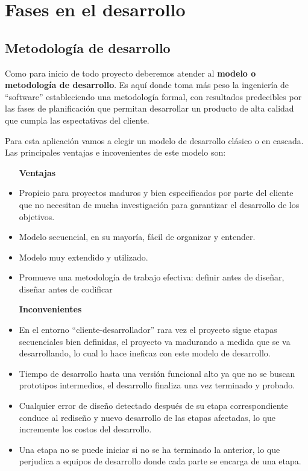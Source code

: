 \chapter{Fases en el desarrollo}

\section{Metodología de desarrollo}

Como para inicio de todo proyecto deberemos atender al \textbf{modelo o metodología de desarrollo}. Es aquí donde toma más peso la ingeniería de ``software'' estableciendo una metodología formal, con resultados predecibles por las fases de planificación que permitan desarrollar un producto de alta calidad que cumpla las espectativas del cliente. 

Para esta aplicación vamos a elegir un modelo de desarrollo clásico o en cascada. Las principales ventajas e incovenientes de este modelo son:

\begin{itemize}
\item [\textbf{Ventajas}]
\item Propicio para proyectos maduros y bien especificados por parte del cliente que no necesitan de mucha investigación para garantizar el desarrollo de los objetivos.
\item Modelo secuencial, en su mayoría, fácil de organizar y entender.
\item Modelo muy extendido y utilizado.
\item Promueve una metodología de trabajo efectiva: definir antes de diseñar, diseñar antes de codificar
\item [\textbf{Inconvenientes}]
\item En el entorno ``cliente-desarrollador'' rara vez el proyecto sigue etapas secuenciales bien definidas, el proyecto va madurando a medida que se va desarrollando, lo cual lo hace ineficaz con este modelo de desarrollo.
\item Tiempo de desarrollo hasta una versión funcional alto ya que no se buscan prototipos intermedios, el desarrollo finaliza una vez terminado y probado.
\item Cualquier error de diseño detectado después de su etapa correspondiente conduce al rediseño y nuevo desarrollo de las etapas afectadas, lo que incremente los costos del desarrollo.
\item Una etapa no se puede iniciar si no se ha terminado la anterior, lo que perjudica a equipos de desarrollo donde cada parte se encarga de una etapa.
\end{itemize}



